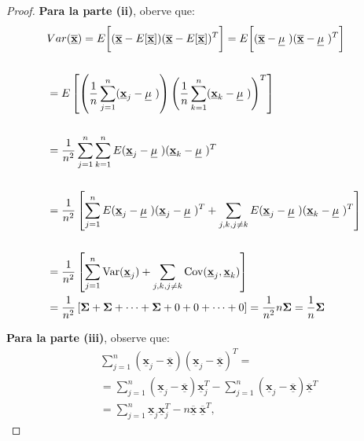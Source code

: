 \documentclass[
]{book}
\theoremstyle{definition}
\theoremstyle{definition}
\theoremstyle{definition}
\theoremstyle{definition}
\theoremstyle{remark}
\begin{document}
\begin{proof}
\textbf{Para la parte (ii)}, oberve que:
\begin{align*}
&Var(\underline{\overline{\mathbf{x}}})=E\biggl[(\underline{\overline{\mathbf{x}}} -E[\underline{\overline{\mathbf{x}}}])(\underline{\overline{\mathbf{x}}} -E[\underline{\overline{\mathbf{x}}}])^T \biggr]=
  E\biggl[(\underline{\overline{\mathbf{x}}} -
{\large \underline{\mathbf{\mu}}}\ )(\underline{\overline{\mathbf{x}}} -
{\large \underline{\mathbf{\mu}}}\ )^T \biggr]\\  \\
&=E\left[ \left(\frac{1}{n}\sum_{j=1}^n (\underline{\mathbf{x}}_j - 
{\large \underline{\mathbf{\mu}}}\ ) \right) \left( \frac{1}{n}\sum_{k=1}^n (\underline{\mathbf{x}}_k - 
{\large \underline{\mathbf{\mu}}}\ )    \right)^T \right] \\ \\
&=\frac{1}{n^2}\sum_{j=1}^n\sum_{k=1}^nE(\underline{\mathbf{x}}_j - 
{\large \underline{\mathbf{\mu}}}\ )(\underline{\mathbf{x}}_k - 
{\large \underline{\mathbf{\mu}}}\ )^T\\ \\
&=\frac{1}{n^2}\left[\sum_{j=1}^nE(\underline{\mathbf{x}}_j - 
{\large \underline{\mathbf{\mu}}}\ )(\underline{\mathbf{x}}_j - 
{\large \underline{\mathbf{\mu}}}\ )^T + \sum_{j,k,j\neq k}E(\underline{\mathbf{x}}_j - 
{\large \underline{\mathbf{\mu}}}\ )(\underline{\mathbf{x}}_k - 
{\large \underline{\mathbf{\mu}}}\ )^T \right]\\ \\
&=\frac{1}{n^2}\left[\sum_{j=1}^n\text{Var}(\underline{\mathbf{x}}_j) + \sum_{j,k,j\neq k}\text{Cov}(\underline{\mathbf{x}}_j, \underline{\mathbf{x}}_k) \right]\\
&=\frac{1}{n^2}\left[\mathbf{\Sigma}+\mathbf{\Sigma}+ \cdots +\mathbf{\Sigma}+  0 + 0 +\cdots +0 \right]=\frac{1}{n^2}n\mathbf{\Sigma}=\frac{1}{n}\mathbf{\Sigma}
\end{align*}

\textbf{Para la parte (iii)}, observe que:
\begin{align*}
&\sum_{j=1}^n(\underline{\mathbf{x}}_j - \underline{\overline{\mathbf{x}}})(\underline{\mathbf{x}}_j - \underline{\overline{\mathbf{x}}})^T=\\
&=\sum_{j=1}^n(\underline{\mathbf{x}}_j - \underline{\overline{\mathbf{x}}})\underline{\mathbf{x}}_j^T-\sum_{j=1}^n(\underline{\mathbf{x}}_j- \underline{\overline{\mathbf{x}}})\underline{\overline{\mathbf{x}}}^T\\
&=\sum_{j=1}^n\underline{\mathbf{x}}_j\underline{\mathbf{x}}_j^T-n\underline{\overline{\mathbf{x}}}\ \underline{\overline{\mathbf{x}}}^T,
\end{align*}


\end{proof}
\end{document}
